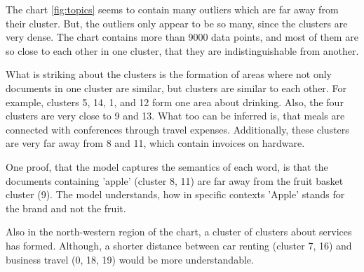 The chart \ref{fig:topics} seems to contain many outliers which are far away from their cluster. But, the outliers only appear to be so many, since the clusters are very dense. The chart contains more than 9000 data points, and most of them are so close to each other in one cluster, that they are indistinguishable from another.

What is striking about the clusters is the formation of areas where not only documents in one cluster are similar, but clusters are similar to each other. For example, clusters 5, 14, 1, and 12 form one area about drinking. Also, the four clusters are very close to 9 and 13. What too can be inferred is, that meals are connected with conferences through travel expenses. Additionally, these clusters are very far away from 8 and 11, which contain invoices on hardware. 

One proof, that the model captures the semantics of each word, is that the documents containing 'apple' (cluster 8, 11) are far away from the fruit basket cluster (9). The model understands, how in specific contexts 'Apple' stands for the brand and not the fruit.

Also in the north-western region of the chart, a cluster of clusters about services has formed. Although, a shorter distance between car renting (cluster 7, 16) and business travel (0, 18, 19) would be more understandable.
